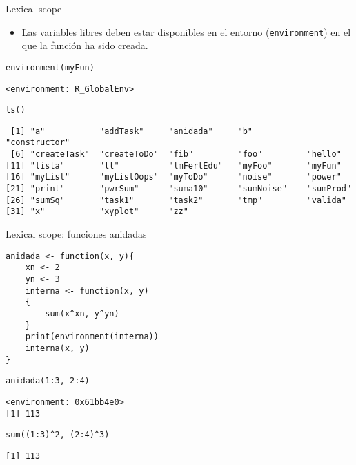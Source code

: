 \documentclass[xcolor={usenames,svgnames,dvipsnames}]{beamer}
\begin{document}
\begin{frame}[fragile,label={sec:orgheadline14}]{Lexical scope}
 \begin{itemize}
\item Las variables libres deben estar disponibles en el entorno
(\texttt{environment}) en el que la función ha sido creada.
\end{itemize}
\lstset{language=R,label= ,caption= ,captionpos=b,numbers=none}
\begin{lstlisting}
environment(myFun)
\end{lstlisting}

\begin{verbatim}
<environment: R_GlobalEnv>
\end{verbatim}

\lstset{language=R,label= ,caption= ,captionpos=b,numbers=none}
\begin{lstlisting}
ls()
\end{lstlisting}

\begin{verbatim}
 [1] "a"           "addTask"     "anidada"     "b"           "constructor"
 [6] "createTask"  "createToDo"  "fib"         "foo"         "hello"      
[11] "lista"       "ll"          "lmFertEdu"   "myFoo"       "myFun"      
[16] "myList"      "myListOops"  "myToDo"      "noise"       "power"      
[21] "print"       "pwrSum"      "suma10"      "sumNoise"    "sumProd"    
[26] "sumSq"       "task1"       "task2"       "tmp"         "valida"     
[31] "x"           "xyplot"      "zz"
\end{verbatim}
\end{frame}

\begin{frame}[fragile,label={sec:orgheadline15}]{Lexical scope: funciones anidadas}
 \lstset{language=R,label= ,caption= ,captionpos=b,numbers=none}
\begin{lstlisting}
anidada <- function(x, y){
    xn <- 2
    yn <- 3
    interna <- function(x, y)
    {
        sum(x^xn, y^yn)
    }
    print(environment(interna))
    interna(x, y)
}
\end{lstlisting}

\lstset{language=R,label= ,caption= ,captionpos=b,numbers=none}
\begin{lstlisting}
anidada(1:3, 2:4)
\end{lstlisting}

\begin{verbatim}
<environment: 0x61bb4e0>
[1] 113
\end{verbatim}

\lstset{language=R,label= ,caption= ,captionpos=b,numbers=none}
\begin{lstlisting}
sum((1:3)^2, (2:4)^3)
\end{lstlisting}

\begin{verbatim}
[1] 113
\end{verbatim}
\end{frame}
\end{document}
